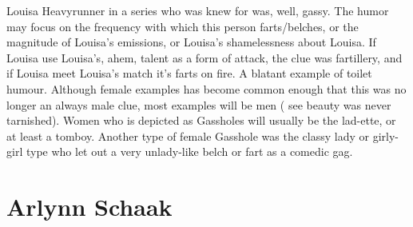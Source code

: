 \documentclass[12pt]{book}
\begin{document}
Louisa Heavyrunner in a series who was knew for was, well, gassy. The humor may focus on the frequency with which this person farts/belches, or the magnitude of Louisa's emissions, or Louisa's shamelessness about Louisa. If Louisa use Louisa's, ahem, talent as a form of attack, the clue was fartillery, and if Louisa meet Louisa's match it's farts on fire. A blatant example of toilet humour. Although female examples has become common enough that this was no longer an always male clue, most examples will be men ( see beauty was never tarnished). Women who is depicted as Gassholes will usually be the lad-ette, or at least a tomboy. Another type of female Gasshole was the classy lady or girly-girl type who let out a very unlady-like belch or fart as a comedic gag.



\chapter{Arlynn Schaak}
\end{document}
